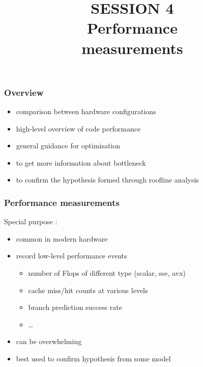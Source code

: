 \documentclass[dvipsnames,presentation,aspectratio=169,14pt]{beamer}
\date{}
\begin{document}
\title{\firasemibold\color{White}%
  {\fontsize{20}{0}\selectfont SESSION 4\\
    \fontsize{40}{40}\selectfont Performance\\measurements\par}}
\titleslide


\begin{frame}
  \frametitle{Overview}
  \begin{itemize}[itemsep=5pt]
  \item comparison between hardware configurations
  \item high-level overview of code performance
  \item general guidance for optimisation
  \end{itemize}
  \pause
  \vskip 11pt

  \begin{itemize}[itemsep=5pt]
  \item to get more information about bottleneck
  \item to confirm the hypothesis formed through roofline analysis
  \end{itemize}
\end{frame}

\begin{frame}
  \frametitle{Performance measurements}
  Special purpose :
  \begin{itemize}[itemsep=5pt]
  \item common in modern hardware
  \item record low-level performance events
    \begin{itemize}[itemsep=3pt]
    \item number of Flops of different type (scalar, sse, avx)
    \item cache miss/hit counts at various levels
    \item branch prediction success rate
    \item \ldots
    \end{itemize}
  \item<2> can be overwhelming
  \item<2> best used to confirm hypothesis from some model
  \end{itemize}
\end{frame}
\end{document}
